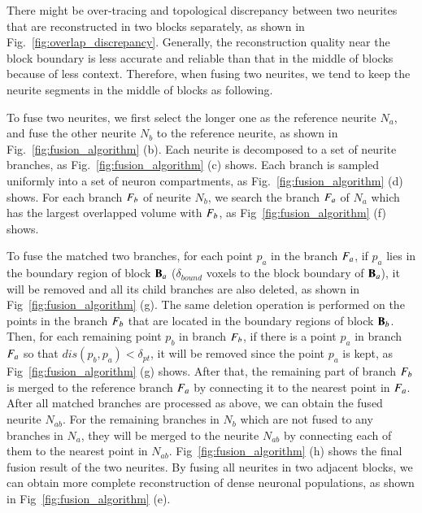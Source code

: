 There might be over-tracing and topological discrepancy between two neurites that are reconstructed in two blocks separately, as shown in Fig.~\ref{fig:overlap_discrepancy}.
Generally, the reconstruction quality near the block boundary is less accurate and reliable than that in the middle of blocks because of less context. 
Therefore, when fusing two neurites, we tend to keep the neurite segments in the middle of blocks as following.
  
To fuse two neurites, we first select the longer one as the reference neurite $N_a$, and fuse the other neurite $N_b$ to the reference neurite, as shown in Fig.~\ref{fig:fusion_algorithm} (b).
%
Each neurite is decomposed to a set of neurite branches, as Fig.~\ref{fig:fusion_algorithm} (c) shows.
Each branch is sampled uniformly into a set of neuron compartments, as Fig.~\ref{fig:fusion_algorithm} (d) shows.
%
For each branch $F_b$ of neurite $N_b$, we search the branch $F_a$ of $N_a$ which has the largest overlapped volume with $F_b$, as Fig~\ref{fig:fusion_algorithm} (f) shows.

To fuse the matched two branches, for each point $p_a$ in the branch $F_a$, if $p_a$ lies in the boundary region of block $\mathbf{B}_a$ ($\delta_{bound}$ voxels to the block boundary of $\mathbf{B}_a$), it will be removed and all its child branches are also deleted, as shown in Fig~\ref{fig:fusion_algorithm} (g).  
The same deletion operation is performed on the points in the branch $F_b$ that are located in the boundary regions of block $\mathbf{B}_b$.
%
Then, for each remaining point $p_b$ in branch $F_b$, if there is a point $p_a$ in branch $F_a$ so that $dis(p_b,p_a)<\delta_{pt}$, it will be removed since the point $p_a$ is kept, as Fig~\ref{fig:fusion_algorithm} (g) shows.
%
After that, the remaining part of branch $F_b$ is merged to the reference branch $F_a$ by connecting it to the nearest point in $F_a$.
After all matched branches are processed as above, we can obtain the fused neurite $N_{ab}$.
%
For the remaining branches in $N_b$ which are not fused to any branches in $N_a$, they will be merged to the neurite $N_{ab}$ by connecting each of them to the nearest point in $N_{ab}$.
%
Fig~\ref{fig:fusion_algorithm} (h) shows the final fusion result of the two neurites. 
By fusing all neurites in two adjacent blocks, we can obtain more complete reconstruction of dense neuronal populations, as shown in Fig~\ref{fig:fusion_algorithm} (e).


